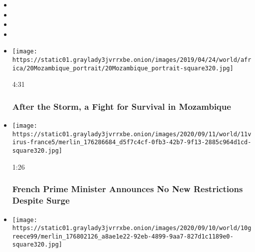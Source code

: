 \begin{itemize}
\item
\item
\item
\item
\end{itemize}

\begin{itemize}
\item
  \href{https://www.nytimes3xbfgragh.onion/video/world/africa/100000006439514/mozambique-flood-cyclone-idai.html?action=click\&module=video-series-bar\&region=header\&pgtype=Article\&playlistId=video/world}{}

  \texttt{[image: https://static01.graylady3jvrrxbe.onion/images/2019/04/24/world/africa/20Mozambique\_portrait/20Mozambique\_portrait-square320.jpg]}

  4:31

  \hypertarget{after-the-storm-a-fight-for-survival-in-mozambique}{%
  \subsubsection{After the Storm, a Fight for Survival in
  Mozambique}\label{after-the-storm-a-fight-for-survival-in-mozambique}}
\item
  \href{https://www.nytimes3xbfgragh.onion/video/world/europe/100000007336352/france-coronavirus-testing.html?action=click\&module=video-series-bar\&region=header\&pgtype=Article\&playlistId=video/world}{}

  \texttt{[image: https://static01.graylady3jvrrxbe.onion/images/2020/09/11/world/11virus-france5/merlin\_176286684\_d5f7c4cf-0fb3-42b7-9f13-2885c964d1cd-square320.jpg]}

  1:26

  \hypertarget{french-prime-minister-announces-no-new-restrictions-despite-surge}{%
  \subsubsection{French Prime Minister Announces No New Restrictions
  Despite
  Surge}\label{french-prime-minister-announces-no-new-restrictions-despite-surge}}
\item
  \href{https://www.nytimes3xbfgragh.onion/video/world/europe/100000007333605/greece-moria-refugee-camp-fires.html?action=click\&module=video-series-bar\&region=header\&pgtype=Article\&playlistId=video/world}{}

  \texttt{[image: https://static01.graylady3jvrrxbe.onion/images/2020/09/10/world/10greece99/merlin\_176802126\_a8ae1e22-92eb-4899-9aa7-827d1c1189e0-square320.jpg]}


\end{itemize}
